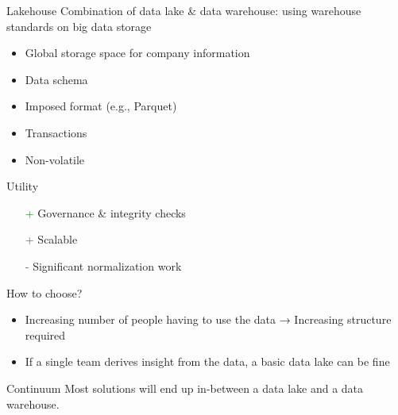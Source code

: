 \begin{frame}{Lakehouse}
  Combination of data lake \& data warehouse: using warehouse standards on big data storage
  \begin{itemize}
    \item Global storage space for company information
    \item Data schema
    \item Imposed format (e.g., Parquet)
    \item Transactions
    \item Non-volatile
  \end{itemize}

  Utility

  \begin{itemize}
    \item[\textcolor{green}{+}] Governance \& integrity checks
    \item[\textcolor{green}{+}] Scalable
    \item[\textcolor{red}{-}] Significant normalization work
  \end{itemize}
\end{frame}

\begin{frame}{How to choose?}
  \begin{itemize}
    \item Increasing number of people having to use the data → Increasing structure required
    \item If a single team derives insight from the data, a basic data lake can be fine
  \end{itemize}
\end{frame}

\begin{frame}{Continuum}
  Most solutions will end up in-between a data lake and a data warehouse.
\end{frame}